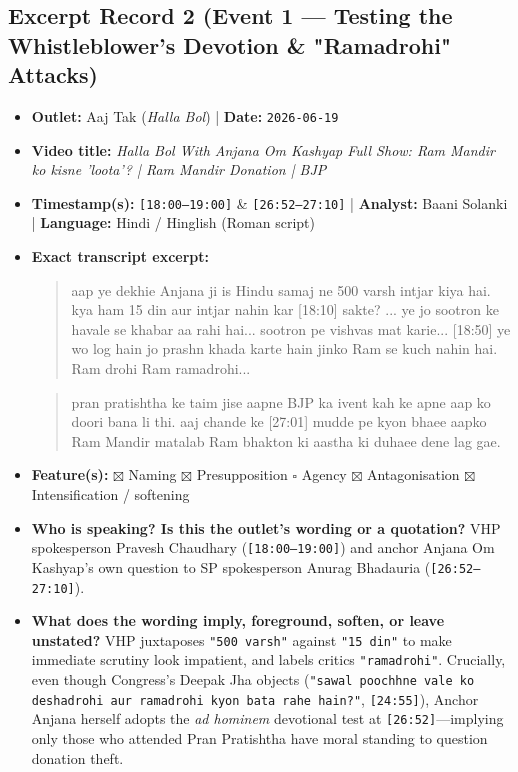 \documentclass[10pt,a4paper]{article}
\begin{document}
\subsection*{Excerpt Record 2 (Event 1 --- Testing the Whistleblower's Devotion \& "Ramadrohi" Attacks)}
\begin{itemize}[leftmargin=1.5em, itemsep=3pt, topsep=4pt]
  \item \textbf{Outlet:} Aaj Tak (\textit{Halla Bol}) | \textbf{Date:} \texttt{2026-06-19}
  \item \textbf{Video title:} \textit{Halla Bol With Anjana Om Kashyap Full Show: Ram Mandir ko kisne 'loota'? | Ram Mandir Donation | BJP}
  \item \textbf{Timestamp(s):} \texttt{[18:00--19:00]} \& \texttt{[26:52--27:10]} | \textbf{Analyst:} Baani Solanki | \textbf{Language:} Hindi / Hinglish (Roman script)
  \item \textbf{Exact transcript excerpt:}
    \begin{quote}\small{} aap ye dekhie Anjana ji is Hindu samaj ne 500 varsh intjar kiya hai. kya ham 15 din aur intjar nahin kar [18:10] sakte? ... ye jo sootron ke havale se khabar aa rahi hai... sootron pe vishvas mat karie... [18:50] ye wo log hain jo prashn khada karte hain jinko Ram se kuch nahin hai. Ram drohi Ram ramadrohi...\end{quote}
    \begin{quote}\small{} pran pratishtha ke taim jise aapne BJP ka ivent kah ke apne aap ko doori bana li thi. aaj chande ke [27:01] mudde pe kyon bhaee aapko Ram Mandir matalab Ram bhakton ki aastha ki duhaee dene lag gae.\end{quote}
  \item \textbf{Feature(s):} $\boxtimes$ Naming $\boxtimes$ Presupposition $\square$ Agency $\boxtimes$ Antagonisation $\boxtimes$ Intensification / softening
  \item \textbf{Who is speaking? Is this the outlet's wording or a quotation?} VHP spokesperson Pravesh Chaudhary (\texttt{[18:00--19:00]}) and anchor Anjana Om Kashyap's own question to SP spokesperson Anurag Bhadauria (\texttt{[26:52--27:10]}).
  \item \textbf{What does the wording imply, foreground, soften, or leave unstated?} VHP juxtaposes \texttt{"500 varsh"} against \texttt{"15 din"} to make immediate scrutiny look impatient, and labels critics \texttt{"ramadrohi"}. Crucially, even though Congress's Deepak Jha objects (\texttt{"sawal poochhne vale ko deshadrohi aur ramadrohi kyon bata rahe hain?"}, \texttt{[24:55]}), Anchor Anjana herself adopts the \textit{ad hominem} devotional test at \texttt{[26:52]}---implying only those who attended Pran Pratishtha have moral standing to question donation theft.

\end{itemize}
\end{document}
